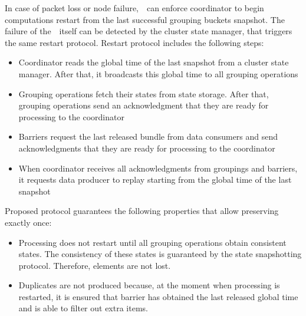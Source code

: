 In case of packet loss or node failure,~\Acker\ can enforce coordinator to begin computations restart from the last successful grouping buckets snapshot. The failure of the~\Acker\ itself can be detected by the cluster state manager, that triggers the same restart protocol. Restart protocol includes the following steps:

\begin{itemize}
    \item Coordinator reads the global time of the last snapshot from a cluster state manager. After that, it broadcasts this global time to all grouping operations
    \item Grouping operations fetch their states from state storage. After that, grouping operations send an acknowledgment that they are ready for processing to the coordinator 
    \item Barriers request the last released bundle from data consumers and send acknowledgments that they are ready for processing to the coordinator
    \item When coordinator receives all acknowledgments from groupings and barriers, it requests data producer to replay starting from the global time of the last snapshot  
\end{itemize}

Proposed protocol guarantees the following properties that allow preserving exactly once:

\begin{itemize}
    \item Processing does not restart until all grouping operations obtain consistent states. The consistency of these states is guaranteed by the state snapshotting protocol. Therefore, elements are not lost.
    \item Duplicates are not produced because, at the moment when processing is restarted, it is ensured that barrier has obtained the last released global time and is able to filter out extra items.
\end{itemize}